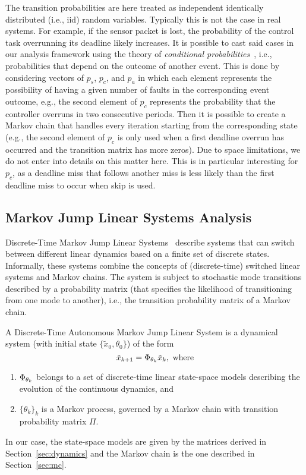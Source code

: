 The transition probabilities are here treated as independent identically distributed (i.e., iid) random variables.
Typically this is not the case in real systems.
For example, if the sensor packet is lost, the probability of the control task overrunning its deadline likely increases.
It is possible to cast said cases in our analysis framework using the theory of \emph{conditional probabilities}~\cite{Dekking:2006}, i.e., probabilities that depend on the outcome of another event.
This is done by considering vectors of $p_s$, $p_c$, and $p_a$ in which each element represents the possibility of having a given number of faults in the corresponding event outcome, e.g., the second element of $p_c$ represents the probability that the controller overruns in two consecutive periods.
Then it is possible to create a Markov chain that handles every iteration starting from the corresponding state (e.g., the second element of $p_c$ is only used when a first deadline overrun has occurred and the transition matrix has more zeros).
Due to space limitations, we do not enter into details on this matter here.
This is in particular interesting for $p_c$, as a deadline miss that follows another miss is less likely than the first deadline miss to occur when skip is used.

\subsection{Markov Jump Linear Systems Analysis}%
\label{sec:mjls}%

Discrete-Time Markov Jump Linear Systems~\cite{Costa:2005} describe systems that can switch between different linear dynamics based on a finite set of discrete states.
Informally, these systems combine the concepts of (discrete-time) switched linear systems and Markov chains.
The system is subject to stochastic mode transitions described by a probability matrix (that specifies the likelihood of transitioning from one mode to another), i.e., the transition probability matrix of a Markov chain.
%
\begin{definition}%
    \label{def:mjls}%
    A Discrete-Time Autonomous Markov Jump Linear System is a dynamical system (with initial state $\{\tilde{x}_0, \theta_0\}$) of the form
    \begin{equation*}
        \tilde{x}_{k+1} = \Phi_{\theta_k} \tilde{x}_k,\text{  where}
    \end{equation*}
    \begin{enumerate}[label=(\roman*)]
        \item $\Phi_{\theta_k}$ belongs to a set of discrete-time linear state-space models describing the evolution of the continuous dynamics, and
        \item $\{\theta_k\}_k$ is a Markov process, governed by a Markov chain with transition probability matrix $\Pi$.
    \end{enumerate}
\end{definition}
%
In our case, the state-space models are given by the matrices derived in Section~\ref{sec:dynamics} and the Markov chain is the one described in Section~\ref{sec:mc}.

